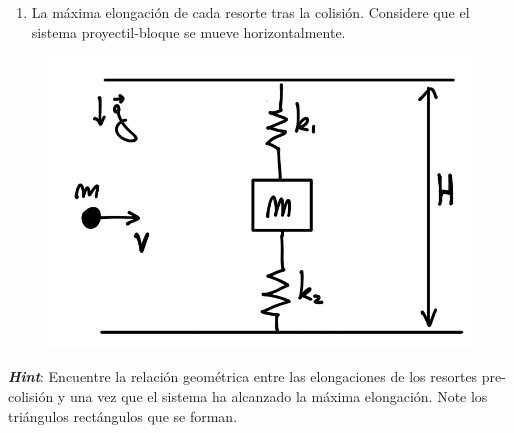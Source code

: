 \documentclass[letterpaper,11pt]{article}
\begin{document}
\begin{enumerate}
\begin{multicols}{2}
\begin{enumerate}
        \item La máxima elongación de cada resorte tras la colisión. Considere que el sistema proyectil-bloque se mueve horizontalmente.
    \end{enumerate}
    
    \columnbreak
    
    \begin{figure}[H]
        \centering
        \includegraphics[width=0.9\linewidth]{2023-1/img/aux_11/p3c2.png}
    \end{figure}
\end{multicols}
\textbf{\textit{Hint}}: Encuentre la relación geométrica entre las elongaciones de los resortes pre-colisión y una vez que el sistema ha alcanzado la máxima elongación. Note los triángulos rectángulos que se forman.  

%   

\end{enumerate}
\end{document}
